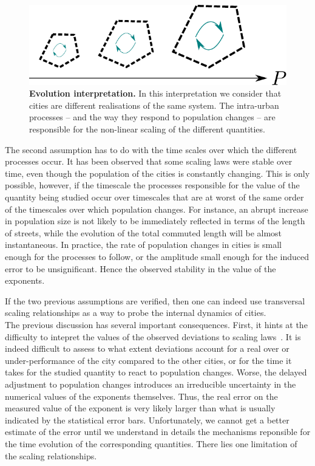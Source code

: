 \begin{figure}[!h]
    \centering
    \includegraphics[width=\textwidth]{gfx/chapter-scaling/evolution-interpretation.pdf}
    \caption{{\bf Evolution interpretation.} In this interpretation we consider
    that cities are different realisations of the same system. The intra-urban
processes -- and the way they respond to population changes -- are responsible for the non-linear scaling of the different
quantities.\label{fig:evolution_interpretation}}
\end{figure}

The second assumption has to do with the time scales over which the different
processes occur. It has been observed that some scaling laws were stable
over time, even though the population of the cities is constantly changing.
This is only possible, however, if the timescale the processes responsible for
the value of the quantity being studied occur over timescales that are at worst
of the same order of the timescales over which population changes. For instance,
an abrupt increase in population size is not likely to be immediately reflected
in terms of the length of streets, while the evolution of the total commuted
length will be almost instantaneous. In practice, the rate of population
changes in cities is small enough for the processes to follow, or the amplitude
small enough for the induced
error to be unsignificant. Hence the observed stability in the value of the
exponents. 

If the two previous assumptions are verified, then one can indeed use
transversal scaling relationships as a way to probe the internal dynamics of
cities.\\

The previous discussion has several important consequences. First, it hints at
the difficulty to intepret the values of the observed deviations to scaling
laws~\cite{Bettencourt:2010a}. It is indeed difficult to assess to what extent
deviations account for a real over or under-performance of the city compared to
the other cities, or for the time it takes for the studied quantity to react to
population changes.  Worse, the delayed adjustment to population changes
introduces an irreducible uncertainty in the numerical values of the exponents
themselves. Thus, the real error on the measured value of the exponent is very
likely larger than what is usually indicated by the statistical error bars.
Unfortunately, we cannot get a better estimate of the error until we understand
in details the mechanisms reponsible for the time evolution of the corresponding
quantities. There lies one limitation of the scaling relationships.


